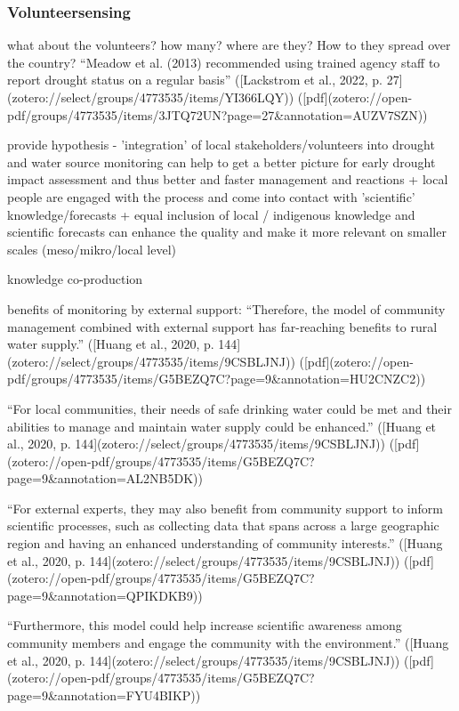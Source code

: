 {\subsubsection{Volunteersensing}
what about the volunteers? how many? where are they? How to they spread over the country?
“Meadow et al. (2013) recommended using trained agency staff to report drought status on a regular basis” ([Lackstrom et al., 2022, p. 27](zotero://select/groups/4773535/items/YI366LQY)) ([pdf](zotero://open-pdf/groups/4773535/items/3JTQ72UN?page=27\&annotation=AUZV7SZN))

provide hypothesis - 'integration' of local stakeholders/volunteers into drought and water source monitoring can help to get a better picture for early drought impact assessment and thus better and faster management and reactions
+ local people are engaged with the process and come into contact with 'scientific' knowledge/forecasts 
+ equal inclusion of local / indigenous knowledge and scientific forecasts can enhance the quality and make it more relevant on smaller scales (meso/mikro/local level)

knowledge co-production
\autocite{dasInteractiveInformationCrowdsourcing2016}

benefits of monitoring by external support:
“Therefore, the model of community management combined with external support has far-reaching benefits to rural water supply.” ([Huang et al., 2020, p. 144](zotero://select/groups/4773535/items/9CSBLJNJ)) ([pdf](zotero://open-pdf/groups/4773535/items/G5BEZQ7C?page=9&annotation=HU2CNZC2))

“For local communities, their needs of safe drinking water could be met and their abilities to manage and maintain water supply could be enhanced.” ([Huang et al., 2020, p. 144](zotero://select/groups/4773535/items/9CSBLJNJ)) ([pdf](zotero://open-pdf/groups/4773535/items/G5BEZQ7C?page=9&annotation=AL2NB5DK))

“For external experts, they may also benefit from community support to inform scientific processes, such as collecting data that spans across a large geographic region and having an enhanced understanding of community interests.” ([Huang et al., 2020, p. 144](zotero://select/groups/4773535/items/9CSBLJNJ)) ([pdf](zotero://open-pdf/groups/4773535/items/G5BEZQ7C?page=9&annotation=QPIKDKB9))

“Furthermore, this model could help increase scientific awareness among community members and engage the community with the environment.” ([Huang et al., 2020, p. 144](zotero://select/groups/4773535/items/9CSBLJNJ)) ([pdf](zotero://open-pdf/groups/4773535/items/G5BEZQ7C?page=9&annotation=FYU4BIKP))

}

